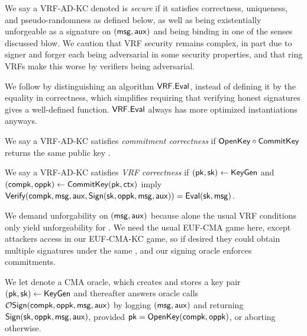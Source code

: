 
We say a VRF-AD-KC denoted \VRF is {\em secure} if it satisfies
 correctness, uniqueness, and pseudo-randomness as defined below,
 as well as being existentially unforgeable as a signature on $(\mathsf{msg},\mathsf{aux})$
 and being binding in one of the senses discussed blow.
We caution that VRF security remains complex, in part due to
signer and forger each being adversarial in some security properties,
and that ring VRFs make this worse by verifiers being adversarial.

We follow \cite{agg_dkg} by distinguishing an algorithm ${\mathsf{VRF}}.{\mathsf{Eval}}$,
 instead of defining it by the equality in correctness,
which simplifies requiring that verifying honest signatures gives a well-defined function.
${\mathsf{VRF}}.{\mathsf{Eval}}$ always has more optimized instantiations anyways.


\begin{definition}
We say a VRF-AD-KC satisfies {\em commitment correctness} if
 ${\mathsf{OpenKey}} \circ {\ensuremath{\mathsf{CommitKey}}}$ returns the same public key \pk.
\end{definition}

\begin{definition}
We say a VRF-AD-KC satisfies {\em VRF correctness} if
$(\mathsf{pk},\mathsf{sk}) \leftarrow {\ensuremath{\mathsf{KeyGen}}}$ and $(\mathsf{compk},\mathsf{oppk}) \leftarrow {\ensuremath{\mathsf{CommitKey}}}(\mathsf{pk},\mathsf{ctx})$
imply
${\mathsf{Verify}}(\mathsf{compk},\mathsf{msg},\mathsf{aux},{\mathsf{Sign}}(\mathsf{sk},\mathsf{oppk},\mathsf{msg},\mathsf{aux})) = {\mathsf{Eval}}(\mathsf{sk},\mathsf{msg})$.
\end{definition}

We demand unforgability on $(\mathsf{msg},\mathsf{aux})$ because alone
 the usual VRF conditions only yield unforgeability for \msg.
We need the usual EUF-CMA game here, except attackers access
\CommitKey in our EUF-CMA-KC game, so if desired
 they could obtain multiple signatures under the same \compk,
 and our signing oracle  enforces commitments.

\begin{definition}\label{def:vrf_sign_oracle}
We let  denote a CMA oracle, which creates and stores
a key pair $(\mathsf{pk},\mathsf{sk}) \leftarrow {\ensuremath{\mathsf{KeyGen}}}$ and thereafter
answers oracle calls $\mathcal{O}\mathsf{Sign}(\mathsf{compk},\mathsf{oppk},\mathsf{msg},\mathsf{aux})$ by 
logging $(\mathsf{msg},\mathsf{aux})$ and returning ${\mathsf{Sign}}(\mathsf{sk},\mathsf{oppk},\mathsf{msg},\mathsf{aux})$,
provided $\mathsf{pk} = {\mathsf{OpenKey}}(\mathsf{compk},\mathsf{oppk})$, or aborting otherwise.
\end{definition}

